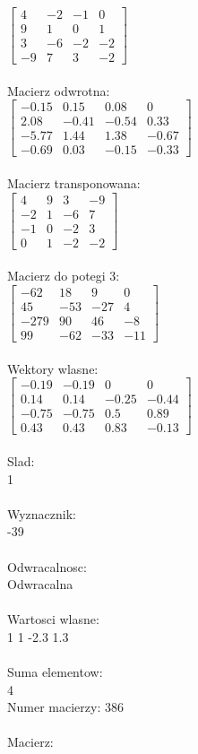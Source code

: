 \documentclass[a4paper,12pt]{article}
\begin{document}
$\begin{bmatrix} 4&-2&-1&0\\9&1&0&1\\3&-6&-2&-2\\-9&7&3&-2 \end{bmatrix}$
\\
\\
Macierz odwrotna:\\

$\begin{bmatrix} -0.15&0.15&0.08&0\\2.08&-0.41&-0.54&0.33\\-5.77&1.44&1.38&-0.67\\-0.69&0.03&-0.15&-0.33 \end{bmatrix}$
\\
\\
Macierz transponowana:\\

$\begin{bmatrix} 4&9&3&-9\\-2&1&-6&7\\-1&0&-2&3\\0&1&-2&-2 \end{bmatrix}$
\\
\\
Macierz do potegi 3:\\

$\begin{bmatrix} -62&18&9&0\\45&-53&-27&4\\-279&90&46&-8\\99&-62&-33&-11 \end{bmatrix}$
\\
\\
Wektory wlasne:\\

$\begin{bmatrix} -0.19&-0.19&0&0\\0.14&0.14&-0.25&-0.44\\-0.75&-0.75&0.5&0.89\\0.43&0.43&0.83&-0.13 \end{bmatrix}$
\\
\\
Slad:\\
1
\\
\\
Wyznacznik:\\
-39
\\
\\
Odwracalnosc:\\
Odwracalna
\\
\\
Wartosci wlasne:\\
1 1 -2.3 1.3
\\
\\
Suma elementow:\\
4
\\
\newpage
Numer macierzy:
386
\\
\\
Macierz:\\
\end{document}

